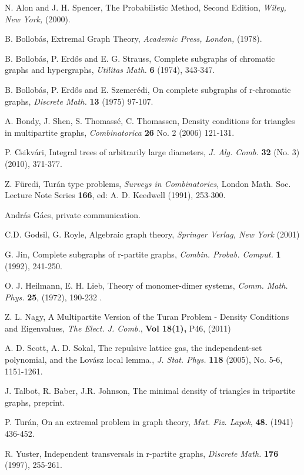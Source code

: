 \documentclass[12pt,a4paper]{amsart}
\numberwithin{equation}{section}
\begin{document}
\begin{thebibliography}{99}

 {\sc N. Alon and J. H. Spencer}, The Probabilistic Method, Second
  Edition, {\em Wiley, New York,} (2000). 

 {\sc B. Bollob\'as}, Extremal Graph Theory, {\em Academic
    Press, London,} (1978). 

 {\sc B. Bollob\'as, P. Erd\H os and E. G. Strauss}, Complete
  subgraphs of chromatic graphs and hypergraphs, {\em Utilitas Math.} {\bf 6}
  (1974), 343-347. 
  
 {\sc B. Bollob\'as, P. Erd\H os and E. Szemer\'edi}, On complete
  subgraphs of r-chromatic graphs, {\em Discrete Math.} {\bf 13} (1975) 97-107.

 {\sc A. Bondy, J. Shen, S. Thomass\'e, C. Thomassen}, Density
  conditions for triangles in multipartite graphs, {\em Combinatorica} {\bf
    26} No. 2 (2006) 121-131.  

 {\sc P. Csikv\'ari}, Integral trees of arbitrarily large
  diameters, {\em J.  Alg. Comb.} {\bf 32} (No. 3) (2010), 371-377. 

 {\sc Z. F\"uredi},  Tur\'an type problems, {\em Surveys in
    Combinatorics}, London Math. Soc. Lecture Note Series {\bf 166}, ed:
  A. D. Keedwell (1991), 253-300. 

 {\sc Andr\'as G\'acs}, private communication.

  {\sc C.D. Godsil, G. Royle}, Algebraic graph theory, {\em
    Springer Verlag, New York} (2001) 

 {\sc G. Jin}, Complete subgraphs of r-partite graphs,
  {\em Combin. Probab. Comput.} {\bf 1} (1992), 241-250. 

 {\sc O. J. Heilmann, E. H. Lieb}, Theory of monomer-dimer
  systems, {\em Comm. Math. Phys.} {\bf 25}, (1972), 190-232 . 

 {\sc Z. L. Nagy,} A Multipartite Version of the Turan Problem
  - Density Conditions and Eigenvalues, {\em The Elect. J. Comb.}, {\bf Vol
    18(1),} P46, (2011) 

 {\sc A. D. Scott, A. D. Sokal}, The repulsive lattice gas,
  the independent-set polynomial, and the Lov\'asz local lemma., {\em
    J. Stat. Phys.} {\bf 118} (2005), No. 5-6,  1151-1261. 

 

 {\sc J. Talbot, R. Baber, J.R. Johnson}, The minimal density
  of triangles in tripartite graphs, preprint.

 {\sc P. Tur\'an}, On an extremal problem in graph theory, {\em
    Mat. Fiz. Lapok}, {\bf 48.} (1941) 436-452. 

 {\sc R. Yuster}, Independent transversals in r-partite graphs,
  {\em Discrete Math.} {\bf 176} (1997), 255-261. 

\end{thebibliography}
\end{document}
